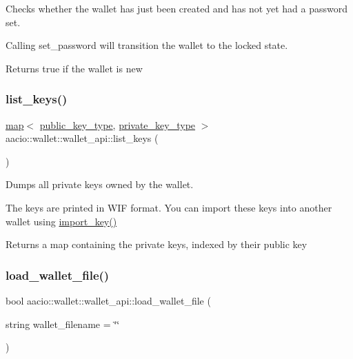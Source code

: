 Checks whether the wallet has just been created and has not yet had a password set.

Calling {\ttfamily set\+\_\+password} will transition the wallet to the locked state. \begin{DoxyReturn}{Returns}
true if the wallet is new 
\end{DoxyReturn}
\mbox{\label{classaacio_1_1wallet_1_1wallet__api_ac6a84d9a87666891359fc655e0fc7bfc}} 
\subsubsection{\texorpdfstring{list\+\_\+keys()}{list\_keys()}}
{\footnotesize\ttfamily \mbox{\hyperlink{classstd_1_1map}{map}}$<$ \mbox{\hyperlink{classfc_1_1crypto_1_1public__key}{public\+\_\+key\+\_\+type}}, \mbox{\hyperlink{classfc_1_1crypto_1_1private__key}{private\+\_\+key\+\_\+type}} $>$ aacio\+::wallet\+::wallet\+\_\+api\+::list\+\_\+keys (\begin{DoxyParamCaption}{ }\end{DoxyParamCaption})}

Dumps all private keys owned by the wallet.

The keys are printed in W\+IF format. You can import these keys into another wallet using {\ttfamily \mbox{\hyperlink{classaacio_1_1wallet_1_1wallet__api_aa59ff70f12bd8dd9fa1d63cb3be09089}{import\+\_\+key()}}} \begin{DoxyReturn}{Returns}
a map containing the private keys, indexed by their public key 
\end{DoxyReturn}
\mbox{\label{classaacio_1_1wallet_1_1wallet__api_a0310fe9e8bf96ab696b6c2919516ba1f}} 
\subsubsection{\texorpdfstring{load\+\_\+wallet\+\_\+file()}{load\_wallet\_file()}}
{\footnotesize\ttfamily bool aacio\+::wallet\+::wallet\+\_\+api\+::load\+\_\+wallet\+\_\+file (\begin{DoxyParamCaption}\item[{string}]{wallet\+\_\+filename = {\ttfamily \char`\"{}\char`\"{}} }\end{DoxyParamCaption})}

